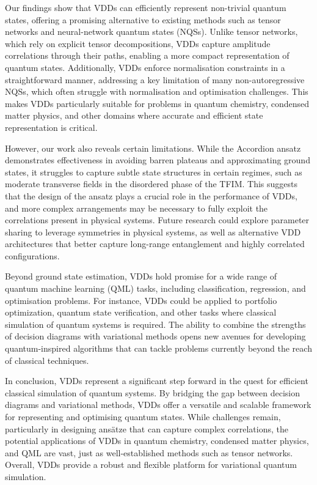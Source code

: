 \documentclass{ieeeaccess}
\begin{document}
Our findings show that VDDs can efficiently represent non-trivial quantum states, offering a promising alternative to existing methods such as tensor networks and neural-network quantum states (NQSs).
Unlike tensor networks, which rely on explicit tensor decompositions, VDDs capture amplitude correlations through their paths, enabling a more compact representation of quantum states.
Additionally, VDDs enforce normalisation constraints in a straightforward manner, addressing a key limitation of many non-autoregressive NQSs, which often struggle with normalisation and optimisation challenges.
This makes VDDs particularly suitable for problems in quantum chemistry, condensed matter physics, and other domains where accurate and efficient state representation is critical.

However, our work also reveals certain limitations.
While the Accordion ansatz demonstrates effectiveness in avoiding barren plateaus and approximating ground states, it struggles to capture subtle state structures in certain regimes, such as moderate transverse fields in the disordered phase of the TFIM.
This suggests that the design of the ansatz plays a crucial role in the performance of VDDs, and more complex arrangements may be necessary to fully exploit the correlations present in physical systems.
Future research could explore parameter sharing to leverage symmetries in physical systems, as well as alternative VDD architectures that better capture long-range entanglement and highly correlated configurations.

Beyond ground state estimation, VDDs hold promise for a wide range of quantum machine learning (QML) tasks, including classification, regression, and optimisation problems.
For instance, VDDs could be applied to portfolio optimization, quantum state verification, and other tasks where classical simulation of quantum systems is required.
The ability to combine the strengths of decision diagrams with variational methods opens new avenues for developing quantum-inspired algorithms that can tackle problems currently beyond the reach of classical techniques.

In conclusion, VDDs represent a significant step forward in the quest for efficient classical simulation of quantum systems.
By bridging the gap between decision diagrams and variational methods, VDDs offer a versatile and scalable framework for representing and optimising quantum states.
While challenges remain, particularly in designing ansätze that can capture complex correlations, the potential applications of VDDs in quantum chemistry, condensed matter physics, and QML are vast, just as well-established methods such as tensor networks.
Overall, VDDs provide a robust and flexible platform for variational quantum simulation.
\end{document}
